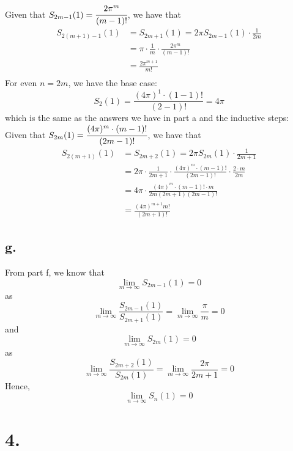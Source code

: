 \documentclass[11pt]{article}
\begin{document}
Given that $S_{2m-1}(1) = \cfrac{2\pi^m}{(m-1)!}$, we have that 
\begin{equation*}
    \begin{aligned}
        S_{2(m+1)-1}(1) 
        &= S_{2m+1}(1) = 2\pi S_{2m-1}(1) \cdot \frac{1}{2m} \\
        &=\pi \cdot \frac{1}{m} \cdot \frac{2\pi^m}{(m-1)!} \\
        &= \frac{2\pi^{m+1}}{m!} \\
    \end{aligned}
\end{equation*}
For even $n=2m$, we have the base case: 
\[
    S_2(1) = \frac{(4\pi)^1 \cdot (1-1)!}{(2-1)!} = 4\pi    
\]
which is the same as the answers we have in part a and the inductive steps: \\
Given that $S_{2m}(1) = \cfrac{(4\pi)^m \cdot (m-1)!}{(2m-1)!}$, we have that
\begin{equation*}
    \begin{aligned}
        S_{2(m+1)}(1) 
        &= S_{2m+2}(1) = 2\pi S_{2m}(1) \cdot \frac{1}{2m+1} \\
        &= 2\pi \cdot \frac{1}{2m+1} \cdot \frac{(4\pi)^m \cdot (m-1)!}{(2m-1)!} \cdot \frac{2 \cdot m}{2m} \\
        &= 4\pi \cdot \frac{(4\pi)^m \cdot (m-1)! \cdot m}{2m(2m+1)(2m-1)!} \\     
        &= \frac{(4\pi)^{m+1} m!}{(2m+1)!}   
    \end{aligned}
\end{equation*}
\subsection*{g.}
From part f, we know that 
\[
    \lim_{m\to \infty} S_{2m-1}(1) = 0     
\]
as 
\[ 
    \lim_{m\to \infty} \frac{S_{2m-1}(1)}{S_{2m+1}(1)} = \lim_{m\to \infty} \frac{\pi}{m} = 0
\]
and 
\[
    \lim_{m\to \infty} S_{2m}(1) = 0     
\]
as 
\[ 
    \lim_{m\to \infty} \frac{S_{2m+2}(1)}{S_{2m}(1)} = \lim_{m\to \infty} \frac{2\pi}{2m+1} = 0
\]
Hence, 
\[
    \lim_{n\to \infty} S_n(1) = 0    
\]
\pagebreak
\section*{4.}
\end{document}
